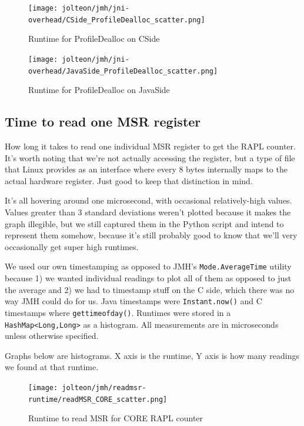 \documentclass{article}
\begin{document}
    \begin{figure}[H]
	    \centering
	    \texttt{[image: jolteon/jmh/jni-overhead/CSide\_ProfileDealloc\_scatter.png]}
	    \caption{Runtime for ProfileDealloc on CSide}
	    \label{fig:jolteon-jmh-runtime-profileDealloc-c}
    \end{figure}
    \begin{figure}[H]
	    \centering
	    \texttt{[image: jolteon/jmh/jni-overhead/JavaSide\_ProfileDealloc\_scatter.png]}
	    \caption{Runtime for ProfileDealloc on JavaSide}
	    \label{fig:jolteon-jmh-runtime-profileDealloc-java}
    \end{figure}
    

    \subsection{Time to read one MSR register}
    How long it takes to read one individual MSR register to get the RAPL counter. It's worth noting that we're not actually accessing the register, but a type of file that Linux provides as an interface where every 8 bytes internally maps to the actual hardware register. Just good to keep that distinction in mind.
    
    It's all hovering around one microsecond, with occasional relatively-high values. Values greater than 3 standard deviations weren't plotted because it makes the graph illegible, but we still captured them
    in the Python script and intend to represent them somehow, because it's still probably good to know
    that we'll very occasionally get super high runtimes.
    
    We used our own timestamping as opposed to JMH's \texttt{Mode.AverageTime} utility because 1) we wanted individual readings to plot all of them as opposed to just the average and 2) we had to timestamp stuff on the C side, which there was no way JMH could do for us. Java timestamps were \texttt{Instant.now()} and C timestamps where \texttt{gettimeofday()}. Runtimes were stored in a \texttt{HashMap<Long,Long>} as a histogram. All measurements are in microseconds unless otherwise specified. 
    
    Graphs below are histograms. X axis is the runtime, Y axis is how many readings we found at that runtime.
    
    \begin{figure}[H]
	    \centering
	    \texttt{[image: jolteon/jmh/readmsr-runtime/readMSR\_CORE\_scatter.png]}
	    \caption{Runtime to read MSR for CORE RAPL counter}
	    \label{fig:CORE-rapl-counter}
    \end{figure}
    
\end{document}
